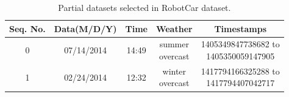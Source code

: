 \begin{table}
	\centering
	\caption{Partial datasets selected in RobotCar dataset.}
	\begin{tabular}{|c|c|c|c|c|}
		\hline
		Seq. No. & Data(M/D/Y) & Time & Weather & Timestamps  \\
		\hline
		0&07/14/2014&14:49&\tabincell{c}{summer\\overcast}& \tabincell{c}{1405349847738682 to\\1405350059147905}\\
		\hline
		1&02/24/2014&12:32&\tabincell{c}{winter\\overcast}& \tabincell{c}{1417794166325288 to\\1417794407042717}\\
		\hline
	\end{tabular}
	\label{tbl:robotcarpartial}
\end{table}

